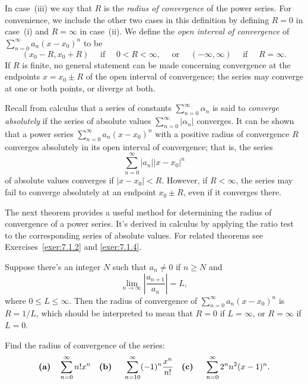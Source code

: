 In case~(iii) we say that $R$ is the {\color{blue}\it radius of convergence\/} of the power series.
For convenience, we include the other two cases in this definition by defining $R=0$ in case~(i) and
$R=\infty$ in case~(ii). We define the {\color{blue}\it open interval of convergence\/} of
$\sum_{n=0}^{\infty}a_{n}(x-x_{0})^{n}$ to be
\[
  (x_{0}-R,x_{0}+R)\quad\mbox{ if }\quad0<R<\infty,\quad\mbox{ or }\quad(-\infty,\infty)\quad\mbox{ if }\quad R=\infty.
\]
If $R$ is finite, no general statement can be made concerning convergence at the endpoints
$x=x_{0}\pm R$ of the open interval of convergence; the series may converge at one or both points,
or diverge at both.

Recall from calculus that a series of constants $\sum_{n=0}^{\infty}\alpha_{n}$ is said to
{\color{blue}\it converge absolutely\/} if the series of absolute values
$\sum_{n=0}^{\infty}|\alpha_{n}|$ converges. It can be shown that a power series
$\sum_{n=0}^{\infty}a_{n}(x-x_{0})^{n}$ with a positive radius of convergence $R$ converges
absolutely in its open interval of convergence; that is, the series
\[
  \sum_{n=0}^{\infty}|a_{n}||x-x_{0}|^{n}
\]
of absolute values converges if $|x-x_{0}|<R$. However, if $R<\infty$, the series may fail to
converge absolutely at an endpoint $x_{0}\pm R$, even if it converges there.

The next theorem provides a useful method for determining the radius of convergence of a power
series. It's derived in calculus by applying the ratio test to the corresponding series of absolute
values. For related theorems see Exercises~\ref{exer:7.1.2} and \ref{exer:7.1.4}.

\begin{theorem}
  \color{blue}
  \label{thmtype:7.1.3} Suppose there's an integer $N$ such that $a_{n}\ne0$ if $n\ge N$ and
  \[
    \lim_{n\to\infty}\left|\frac{a_{n+1}}{a_{n}}\right|=L,
  \]
  where $0\le L\le\infty$. Then the radius of convergence of $\sum_{n=0}^{\infty}a_{n}(x-x_{0})^{n}$
  is $R=1/L$, which should be interpreted to mean that $R=0$ if $L=\infty$, or $R=\infty$ if $L=0$.
\end{theorem}

\begin{example}
  \label{example:7.1.1} \rm Find the radius of convergence of the series:
  \[
    \mbox{\bf (a)}\quad\sum_{n=0}^{\infty}n!x^{n}\quad\mbox{\bf (b) }\quad \sum_{n=10}^{\infty}(-1)^{n}\frac{x^{n}}{n!}\quad\mbox{\bf (c) }\quad \sum_{n=0}^{\infty}2^{n}n^{2}(x-1)^{n}.
  \]
\end{example}

